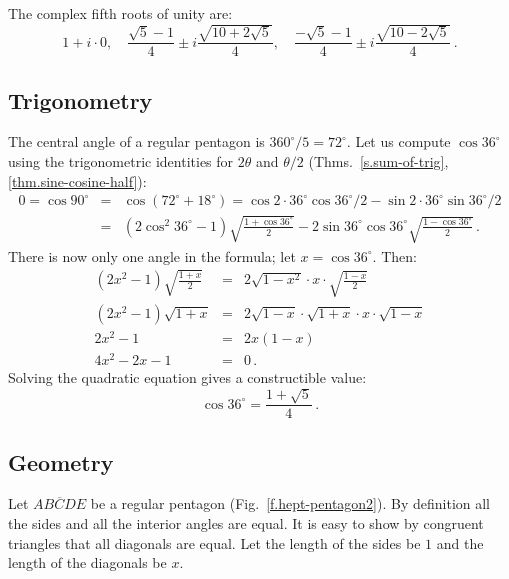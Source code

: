 \begin{advanced}
The complex fifth roots of unity are:
\[
1+i\cdot 0,\quad\frac{\sqrt{5}-1}{4}\pm i \frac{\sqrt{10+2\sqrt{5}}}{4},\quad\frac{-\sqrt{5}-1}{4}\pm i \frac{\sqrt{10-2\sqrt{5}}}{4}\,.
\]
\vspace{-3ex}
\end{advanced}

\subsection{Trigonometry}
The central angle of a regular pentagon is $360^\circ/5=72^\circ$. Let us compute $\cos 36^\circ$ using the  trigonometric identities for $2\theta$ and $\theta/2$ (Thms.~\ref{s.sum-of-trig}, \ref{thm.sine-cosine-half}):
\begin{eqnarray*}
0=\cos 90^\circ &=& \cos(72^\circ+18^\circ)=\cos 2\cdot 36^\circ\cos 36^\circ/2 - \sin 2\cdot 36^\circ\sin 36^\circ/2\\
&=&(2\cos^2 36^\circ-1)\sqrt{\frac{1+\cos 36^\circ}{2}}-2\sin 36^\circ\cos 36^\circ\sqrt{\frac{1-\cos 36^\circ}{2}}\,.
\end{eqnarray*}
There is now only one angle in the formula; let $x=\cos 36^\circ$. Then:
\begin{eqnarray*}
(2x^2-1)\sqrt{\frac{1+x}{2}}&=&2\sqrt{1-x^2}\cdot x \cdot \sqrt{\frac{1-x}{2}}\\
(2x^2-1)\sqrt{1+x}&=&2\sqrt{1-x}\cdot\sqrt{1+x}\cdot x \cdot \sqrt{1-x}\\
2x^2-1&=&2x(1-x)\\
4x^2-2x-1&=&0\,.
\end{eqnarray*}
Solving the quadratic equation gives a constructible value:
\[
\cos 36^\circ = \frac{1+\sqrt{5}}{4}\,.
\]

\subsection{Geometry}\label{s.geometry-pentagon}

Let $\overline{ABCDE}$ be a regular pentagon (Fig.~\ref{f.hept-pentagon2}). By definition all the sides and all the interior angles are equal. It is easy to show by congruent triangles that all diagonals are equal. Let the length of the sides be $1$ and the length of the diagonals be $x$.

